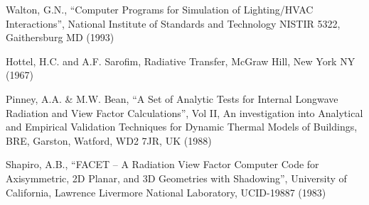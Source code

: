 \documentclass[10pt]{article}
\begin{document}
\noindent
[2] Walton, G.N., ``Computer Programs for Simulation of Lighting/HVAC
Interactions'', National Institute of Standards and Technology NISTIR 5322,
Gaithersburg MD (1993)

\noindent
[3] Hottel, H.C. and A.F. Sarofim, Radiative Transfer, McGraw Hill, New York 
NY (1967)

\noindent
[4] Pinney, A.A. \& M.W. Bean, ``A Set of Analytic Tests for Internal Longwave
Radiation and View Factor Calculations'', Vol II, An investigation into 
Analytical and Empirical Validation Techniques for Dynamic Thermal Models of
Buildings, BRE, Garston, Watford, WD2 7JR, UK (1988)

\noindent
[5] Shapiro, A.B., ``FACET – A Radiation View Factor Computer Code for
Axisymmetric, 2D Planar, and 3D Geometries with Shadowing'', University of
California, Lawrence Livermore National Laboratory, UCID-19887 (1983)
\end{document}
